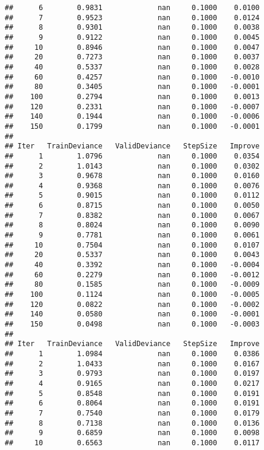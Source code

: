 \documentclass[]{article}
\begin{document}
\begin{verbatim}
##      6        0.9831             nan     0.1000    0.0100
##      7        0.9523             nan     0.1000    0.0124
##      8        0.9301             nan     0.1000    0.0038
##      9        0.9122             nan     0.1000    0.0045
##     10        0.8946             nan     0.1000    0.0047
##     20        0.7273             nan     0.1000    0.0037
##     40        0.5337             nan     0.1000    0.0028
##     60        0.4257             nan     0.1000   -0.0010
##     80        0.3405             nan     0.1000   -0.0001
##    100        0.2794             nan     0.1000    0.0013
##    120        0.2331             nan     0.1000   -0.0007
##    140        0.1944             nan     0.1000   -0.0006
##    150        0.1799             nan     0.1000   -0.0001
## 
## Iter   TrainDeviance   ValidDeviance   StepSize   Improve
##      1        1.0796             nan     0.1000    0.0354
##      2        1.0143             nan     0.1000    0.0302
##      3        0.9678             nan     0.1000    0.0160
##      4        0.9368             nan     0.1000    0.0076
##      5        0.9015             nan     0.1000    0.0112
##      6        0.8715             nan     0.1000    0.0050
##      7        0.8382             nan     0.1000    0.0067
##      8        0.8024             nan     0.1000    0.0090
##      9        0.7781             nan     0.1000    0.0061
##     10        0.7504             nan     0.1000    0.0107
##     20        0.5337             nan     0.1000    0.0043
##     40        0.3392             nan     0.1000   -0.0004
##     60        0.2279             nan     0.1000   -0.0012
##     80        0.1585             nan     0.1000   -0.0009
##    100        0.1124             nan     0.1000   -0.0005
##    120        0.0822             nan     0.1000   -0.0002
##    140        0.0580             nan     0.1000   -0.0001
##    150        0.0498             nan     0.1000   -0.0003
## 
## Iter   TrainDeviance   ValidDeviance   StepSize   Improve
##      1        1.0984             nan     0.1000    0.0386
##      2        1.0433             nan     0.1000    0.0167
##      3        0.9793             nan     0.1000    0.0197
##      4        0.9165             nan     0.1000    0.0217
##      5        0.8548             nan     0.1000    0.0191
##      6        0.8064             nan     0.1000    0.0191
##      7        0.7540             nan     0.1000    0.0179
##      8        0.7138             nan     0.1000    0.0136
##      9        0.6859             nan     0.1000    0.0098
##     10        0.6563             nan     0.1000    0.0117

\end{verbatim}
\end{document}
